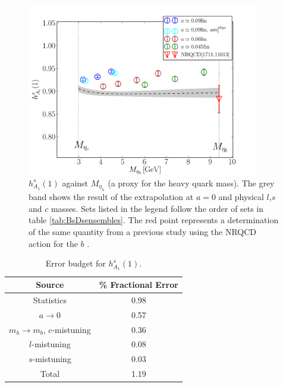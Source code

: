 \begin{figure}[htb!]
  \begin{center}
  \includegraphics[width=0.90\textwidth]{images/BsDsstar/hA1_vsmh.pdf}
  \caption{ $h_{A_1}^s(1)$ against $M_{\eta_h}$ (a proxy for the heavy quark mass). The grey band shows the result of the extrapolation at $a=0$ and physical $l$,$s$ and $c$ masses. Sets listed in the legend follow the order of sets in table \ref{tab:BsDsensembles}. The red point represents a determination of the same quantity from a previous study using the NRQCD action for the $b$ \cite{Harrison:2017fmw}. \label{fig:hA1_vsmetah}}
  \end{center}
\end{figure}

\begin{table}
  \begin{center}
    \begin{tabular}{c c}
      \hline
      Source & \% Fractional Error \\ [0.5ex]
      \hline
      Statistics & 0.98  \\ [1ex]
      $a\to 0$ & 0.57  \\ [1ex]
      $m_h \to m_b$, $c$-mistuning & 0.36 \\ [1ex]
      $l$-mistuning & 0.08  \\ [1ex]
      $s$-mistuning & 0.03  \\ [1ex]
      \hline
      Total & 1.19 \\ [1ex]
      \hline
    \end{tabular}
  \end{center}
  \caption{Error budget for $h^s_{A_1}(1)$. \label{tab:errorbudget}}
\end{table}

